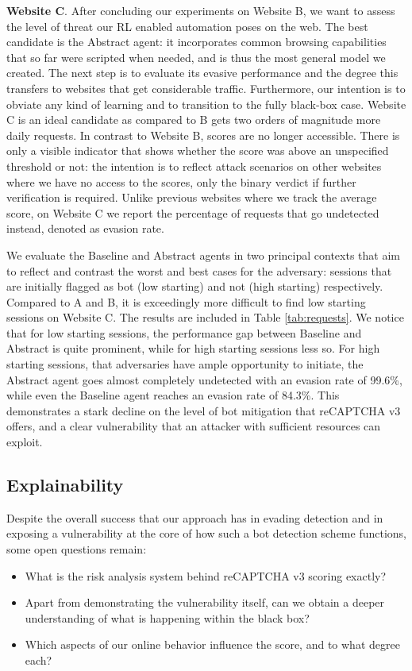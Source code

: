 \textbf{Website C}. After concluding our experiments on Website B, we want to assess the level of threat our \gls{RL} enabled automation poses on the web.
The best candidate is the Abstract agent: it incorporates common browsing capabilities that so far were scripted when needed, and is thus the most general model we created.
The next step is to evaluate its evasive performance and the degree this transfers to websites that get considerable traffic.
Furthermore, our intention is to obviate any kind of learning and to transition to the fully black-box case.
Website C is an ideal candidate as compared to B gets two orders of magnitude more daily requests.
In contrast to Website B, scores are no longer accessible.
There is only a visible indicator that shows whether the score was above an unspecified threshold or not: the intention is to reflect attack scenarios on other websites where we have no access to the scores, only the binary verdict if further verification is required.
Unlike previous websites where we track the average score, on Website C we report the percentage of requests that go undetected instead, denoted as evasion rate.

We evaluate the Baseline and Abstract agents in two principal contexts that aim to reflect and contrast the worst and best cases for the adversary: sessions that are initially flagged as bot (low starting) and not (high starting) respectively.
Compared to A and B, it is exceedingly more difficult to find low starting sessions on Website C.
The results are included in Table \ref{tab:requests}.
We notice that for low starting sessions, the performance gap between Baseline and Abstract is quite prominent, while for high starting sessions less so.
For high starting sessions, that adversaries have ample opportunity to initiate, the Abstract agent goes almost completely undetected with an evasion rate of 99.6\%, while even the Baseline agent reaches an evasion rate of 84.3\%.
This demonstrates a stark decline on the level of bot mitigation that reCAPTCHA v3 offers, and a clear vulnerability that an attacker with sufficient resources can exploit.

\subsection{Explainability}

Despite the overall success that our approach has in evading detection and in exposing a vulnerability at the core of how such a bot detection scheme functions, some open questions remain:
\begin{itemize}
    \item What is the risk analysis system behind reCAPTCHA v3 scoring exactly?
    \item Apart from demonstrating the vulnerability itself, can we obtain a deeper understanding of what is happening within the black box?
    \item Which aspects of our online behavior influence the score, and to what degree each?
\end{itemize}

